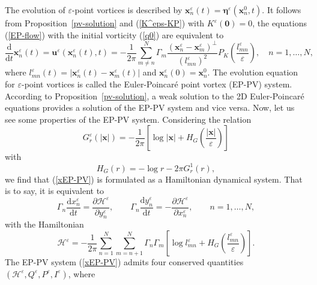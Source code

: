 \documentclass{article}
\theoremstyle{definition}
\begin{document}
The evolution of $\varepsilon$-point vortices is described by
 ${\bm x}_n^\varepsilon(t) = {\bm \eta}^\varepsilon({\bm x}_n^0, t)$. It follows from Proposition~\ref{pv-solution} and (\ref{K^eps-KP}) with $K^\varepsilon({\bm 0})=0$, the equations (\ref{EP-flow}) with the initial vorticity (\ref{q0}) are
 equivalent to
\begin{equation}
\frac{\mbox{d}}{\mbox{d}t} {\bm x}_n^\varepsilon(t) = {\bm u}^\varepsilon\left( {\bm x}_n^\varepsilon(t), t \right) = - \frac{1}{2\pi} \sum_{m\neq n}^N \Gamma_m \frac{( {\bm x}_n^\varepsilon - {\bm x}_m^\varepsilon )^\perp}{(l_{mn}^\varepsilon) ^2} P_K \left( \frac{l_{mn}^\varepsilon}{\varepsilon} \right), \quad  n = 1,\dots,N,   \label{xEP-PV}  
\end{equation}
where $l_{mn}^\varepsilon(t) = \vert{\bm x}_n^\varepsilon(t) - {\bm x}_m^\varepsilon(t)\vert$ and ${\bm x}_n^\varepsilon(0) = {\bm x}_n^0$.
 The evolution equation for $\varepsilon$-point vortices is called  the Euler-Poincar\'{e} point vortex (EP-PV) system.
According to Proposition~\ref{pv-solution}, a weak solution to the 2D Euler-Poincar\'{e} equations provides a solution of the EP-PV system and vice versa. 
Now, let us see some  properties of the EP-PV system. Considering the relation
\begin{equation*}
G_r^\varepsilon(\vert{\bm x}\vert) = - \frac{1}{2 \pi} \left[ \log{\vert{\bm x}\vert} + H_G\left( \frac{\vert{\bm x}\vert}{\varepsilon} \right) \right]
\end{equation*}
with 
\begin{equation}
H_G(r) = - \log{r} - 2 \pi G_r^1(r), 
\label{H_G}
\end{equation}
we find that (\ref{xEP-PV}) is formulated as a Hamiltonian dynamical system. That is to say, it is equivalent to
\begin{equation*}
\Gamma_n \frac{\mbox{d} x_n^\varepsilon}{\mbox{d}t}  = \frac{\partial \mathscr{H}^\varepsilon}{\partial y_n^\varepsilon}, \qquad \Gamma_n \frac{\mbox{d} y_n^\varepsilon}{\mbox{d}t}  = - \frac{\partial \mathscr{H}^\varepsilon}{\partial x_n^\varepsilon}, \qquad  n = 1,\dots,N,
\end{equation*}
with the Hamiltonian
\begin{equation}
\mathscr{H}^\varepsilon = - \frac{1}{2 \pi} \sum_{n=1}^N \sum_{m=n+1}^N \Gamma_n \Gamma_m \left[ \log{l_{mn}^\varepsilon} + H_G\left( \frac{l_{mn}^\varepsilon}{\varepsilon} \right) \right]. \label{EP-Hamiltonian}
\end{equation}
The EP-PV system (\ref{xEP-PV}) admits four conserved quantities $(\mathscr{H}^\varepsilon, Q^\varepsilon, P^\varepsilon, I^\varepsilon)$, where 
\end{document}
